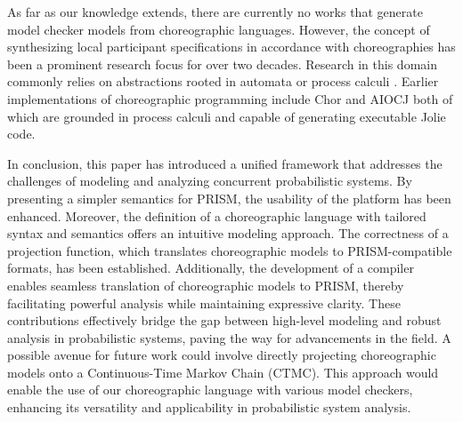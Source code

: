 As far as our knowledge extends, there are currently no works that generate model checker models from choreographic languages.
However, the concept of synthesizing local participant specifications in accordance with choreographies has been a prominent research focus for over two decades. Research in this domain commonly relies on abstractions rooted in automata or process calculi \cite{DBLP:conf/popl/HondaYC08,DBLP:journals/scp/AutiliIT18}. 
Earlier implementations of choreographic programming include Chor \cite{DBLP:conf/popl/CarboneM13} and AIOCJ \cite{DBLP:journals/corr/PredaGGLM16} both of which are grounded in process calculi and capable of generating executable Jolie code.

In conclusion, this paper has introduced a unified framework that addresses the challenges of modeling and analyzing concurrent probabilistic systems. By presenting a simpler semantics for PRISM, the usability of the platform has been enhanced. Moreover, the definition of a choreographic language with tailored syntax and semantics offers an intuitive modeling approach. The correctness of a projection function, which translates choreographic models to PRISM-compatible formats, has been established. Additionally, the development of a compiler enables seamless translation of choreographic models to PRISM, thereby facilitating powerful analysis while maintaining expressive clarity. These contributions effectively bridge the gap between high-level modeling and robust analysis in probabilistic systems, paving the way for advancements in the field. 
A possible avenue for future work could involve directly projecting choreographic models onto a Continuous-Time Markov Chain (CTMC). This approach would enable the use of our choreographic language with various model checkers, enhancing its versatility and applicability in probabilistic system analysis.
